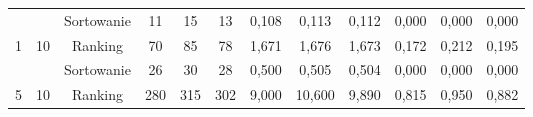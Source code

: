 \documentclass[magisterska]{pracamgr}
\begin{document}
\begin{table}[H]
{\begin{tabular}{@{}cccccccccccc@{}}
                                                                &                                                         & Sortowanie & 11                                                      & 15                                                      & 13                                                         & 0,108                                                      & 0,113                                                      & 0,112                                                          & 0,000                                                              & 0,000                                                               & 0,000                                                                  \\
1                                                               & 10                                                      & Ranking    & 70                                                      & 85                                                      & 78                                                         & 1,671                                                      & 1,676                                                      & 1,673                                                          & 0,172                                                              & 0,212                                                               & 0,195                                                                  \\ \midrule
                                                                &                                                         & Sortowanie & 26                                                      & 30                                                      & 28                                                         & 0,500                                                      & 0,505                                                      & 0,504                                                          & 0,000                                                              & 0,000                                                               & 0,000                                                                  \\
5                                                               & 10                                                      & Ranking    & 280                                                     & 315                                                     & 302                                                        & 9,000                                                      & 10,600                                                     & 9,890                                                          & 0,815                                                              & 0,950                                                               & 0,882                                                                  \\ \bottomrule
\end{tabular}%
}
\end{table}
\end{document}
